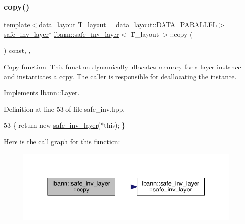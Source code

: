 \subsubsection{\texorpdfstring{copy()}{copy()}}
{\footnotesize\ttfamily template$<$data\+\_\+layout T\+\_\+layout = data\+\_\+layout\+::\+D\+A\+T\+A\+\_\+\+P\+A\+R\+A\+L\+L\+EL$>$ \\
\hyperlink{classlbann_1_1safe__inv__layer}{safe\+\_\+inv\+\_\+layer}$\ast$ \hyperlink{classlbann_1_1safe__inv__layer}{lbann\+::safe\+\_\+inv\+\_\+layer}$<$ T\+\_\+layout $>$\+::copy (\begin{DoxyParamCaption}{ }\end{DoxyParamCaption}) const\hspace{0.3cm}{\ttfamily [inline]}, {\ttfamily [override]}, {\ttfamily [virtual]}}

Copy function. This function dynamically allocates memory for a layer instance and instantiates a copy. The caller is responsible for deallocating the instance. 

Implements \hyperlink{classlbann_1_1Layer_af420f22bbac801c85483ade84588a23f}{lbann\+::\+Layer}.



Definition at line 53 of file safe\+\_\+inv.\+hpp.


\begin{DoxyCode}
53 \{ \textcolor{keywordflow}{return} \textcolor{keyword}{new} \hyperlink{classlbann_1_1safe__inv__layer_a8568b80fcabd1427eaa4b4deed294f5e}{safe\_inv\_layer}(*\textcolor{keyword}{this}); \}
\end{DoxyCode}
Here is the call graph for this function\+:\nopagebreak
\begin{figure}[H]
\begin{center}
\leavevmode
\includegraphics[width=337pt]{classlbann_1_1safe__inv__layer_aaaf9a3b769c579122cd361caa65c7958_cgraph}
\end{center}
\end{figure}
\mbox{\label{classlbann_1_1safe__inv__layer_a070fe64c2a605eb5624d509740de1c32}} 
